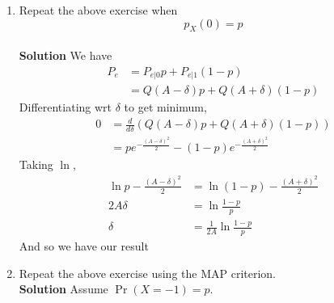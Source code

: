 \documentclass[journal, 12pt, twocolumn]{IEEEtran}
\providecommand{\pr}[1]{\ensuremath{\Pr\left(#1\right)}}
\begin{document}
\begin{enumerate}[label=\arabic{section}.\arabic*]
    \item
        Repeat the above exercise when
        \begin{equation}
            p_X(0) = p
        \end{equation}
        \\
        \textbf{Solution} We have
        \begin{align}
            P_e &= P_{e|0} p + P_{e|1} (1 - p) \\
            &= Q(A - \delta) p + Q(A + \delta) (1 - p)
        \end{align}
        Differentiating wrt $\delta$ to get minimum,
        \begin{align}
            0 &= \frac{d}{d\delta}(Q(A - \delta) p + Q(A + \delta) (1 - p)) \\
            &= pe^{-\frac{(A - \delta)^2}{2}} - (1 - p) e^{-\frac{(A + \delta)^2}{2}}
        \end{align}
        Taking $\ln$,
        \begin{align}
            \ln{p} - \frac{(A - \delta)^2}{2} &= \ln(1 - p) - \frac{(A + \delta)^2}{2} \\
            2 A \delta &= \ln \frac{1 - p}{p} \\
            \delta &= \frac{1}{2 A} \ln \frac{1 - p}{p}
        \end{align}
        And so we have our result

    \item
        Repeat the above exercise using the MAP criterion.
        \\
        \textbf{Solution}
        Assume $\pr{X = -1} = p$.


\end{enumerate}
\end{document}
